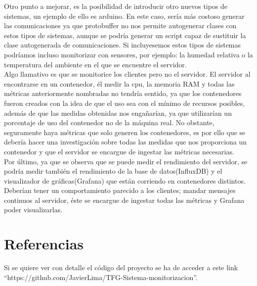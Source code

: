 \documentclass[ spanish, a4paper, 12pt, oneside]{report}
\begin{document}
Otro punto a mejorar, es la posibilidad de introducir otro nuevos tipos de sistemas, un ejemplo de ello es arduino. En este caso, sería más costoso generar las comunicaciones ya que protobuffer no nos permite autogenerar clases con estos tipos de sistemas, aunque se podría generar un script capaz de sustituir la clase autogenerada de comunicaciones. Si incluyesemos estos 
tipos de sistemas podríamos incluso monitorizar con sensores, por ejemplo: la humedad relativa o la temperatura del ambiente en el que se encuentre el servidor. \\

Algo llamativo es que se monitorice los clientes pero no el servidor. El servidor al encontrarse en un contenedor, él medir la cpu, la memoria RAM y todas las métricas anteriormente nombradas no tendría sentido, ya que los contenedores fueron creados con la idea de que el uso sea con el mínimo de recursos posibles, además de que las medidas obtenidas nos engañarían, ya que 
utilizarían un porcentaje de uso del contenedor no de la máquina real. No obstante, seguramente haya métricas que solo generen los contenedores, es por ello que se debería hacer una investigación sobre todas las medidas que nos proporciona un contenedor y que el servidor se encargue de ingestar las métricas necesarias.\\ 

Por último, ya que se observa que se puede medir el rendimiento del servidor, se podría medir también el rendimiento de la base de datos(InfluxDB) y el visualizador de gráficas(Grafana) que están corriendo en contenedores distintos. Deberían tener un comportamiento parecido a los clientes; mandar mensajes continuos al servidor, éste se encargue de ingestar todas las métricas 
y Grafana poder visualizarlas.\\

\chapter{Referencias}
Si se quiere ver con detalle el código del proyecto se ha de acceder a este link ``https://github.com/JavierLima/TFG-Sistema-monitorizacion''. \\
\end{document}
